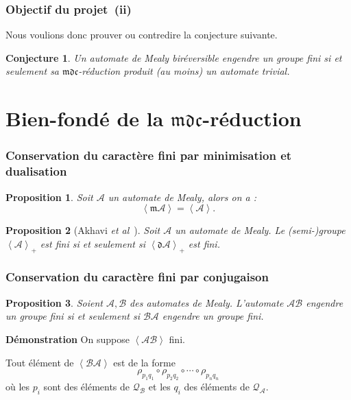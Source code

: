 \documentclass[11pt]{beamer}
\newtheorem{prop}{Proposition}
\newtheorem{conj}{Conjecture}
\begin{document}
\begin{frame}
  \frametitle{Objectif du projet~(ii)}

  Nous voulions donc prouver ou contredire la conjecture suivante.

  \begin{conj}
    Un automate de Mealy biréversible engendre un groupe fini si et seulement sa $\mathfrak{mdc}$-réduction produit (au moins) un automate trivial.
  \end{conj}

\end{frame}

\section{Bien-fondé de la $\mathfrak{mdc}$-réduction}

\begin{frame}
  \frametitle{Conservation du caractère fini par minimisation et dualisation}
  \begin{prop}
    Soit $\mathcal{A}$ un automate de Mealy, alors on a :
    \[ \left<\mathfrak{m}\mathcal{A}\right> = \left<\mathcal{A}\right>. \]
  \end{prop}

  \begin{prop}[Akhavi \emph{et al}~\cite{DBLP:journals/corr/abs-1105-4725}]
    Soit $\mathcal{A}$ un automate de Mealy. Le (semi-)groupe $\left<\mathcal{A}\right>_+$ est fini si et seulement si $\left<\mathfrak{d}\mathcal{A}\right>_+$ est fini.
  \end{prop}
\end{frame}

\begin{frame}
  \frametitle{Conservation du caractère fini par conjugaison}

  \begin{prop} %
    Soient $\mathcal{A}, \mathcal{B}$ des automates de Mealy.
    L'automate $\mathcal{A}\mathcal{B}$ engendre un groupe fini si et seulement si $\mathcal{B}\mathcal{A}$ engendre un groupe fini.
  \end{prop}

  \textbf{Démonstration}
  On suppose $\left<\mathcal{A}\mathcal{B}\right>$ fini.

  Tout élément de $\left<\mathcal{B}\mathcal{A}\right>$ est de la forme
  \[
    \rho_{p_1q_1}\circ\rho_{p_2q_2}\circ\cdots\circ\rho_{p_nq_n}
  \]
  où les $p_i$ sont des éléments de $\mathcal{Q}_\mathcal{B}$ et les $q_i$ des éléments de $\mathcal{Q}_\mathcal{A}$.
\end{frame}
\end{document}
